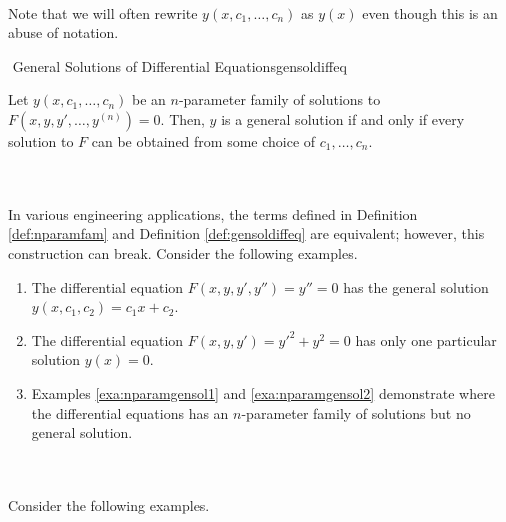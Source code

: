         \\
        Note that we will often rewrite \(y(x,c_1,\ldots,c_n)\) as \(y(x)\) even though this is an abuse of notation.
        \begin{definition}{\Stop\,\,General Solutions of Differential Equations}{gensoldiffeq}

            Let \(y(x,c_1,\ldots,c_n)\) be an \(n\)-parameter family of solutions to \(F(x,y,y',\ldots,y^{(n)})=0\). Then, \(y\) is a general solution if and only if every solution to \(F\) can be obtained from some choice of \(c_1,\ldots,c_n\).
            
        \end{definition}
        \vphantom
        \\
        \\
        In various engineering applications, the terms defined in Definition \ref{def:nparamfam} and Definition \ref{def:gensoldiffeq} are equivalent; however, this construction can break. Consider the following examples.
       \begin{enumerate}
            \item The differential equation \(F(x,y,y',y'')=y''=0\) has the general solution \(y(x,c_1,c_2)=c_1x+c_2\).
            \item The differential equation \(F(x,y,y')=y'^2+y^2=0\) has only one particular solution \(y(x)=0\).
            \item Examples \ref{exa:nparamgensol1} and \ref{exa:nparamgensol2} demonstrate where the differential equations has an \(n\)-parameter family of solutions but no general solution.
       \end{enumerate}
       \pagebreak
       \vphantom
       \\
       \\
       Consider the following examples.
